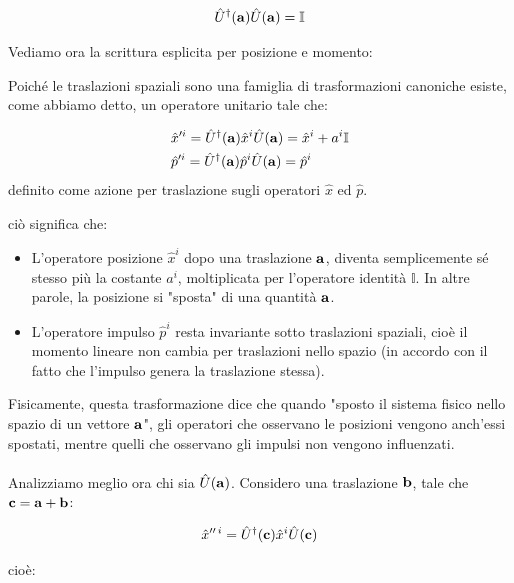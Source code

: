 \begin{align*}
	\hat{U}^{\dagger}(\vb{a}) \hat{U}(\vb{a}) = \mathbb{I}
\end{align*}

	Vediamo ora la scrittura esplicita per posizione e momento:

\begin{nb}
	Poiché le traslazioni spaziali sono una famiglia di trasformazioni canoniche esiste, come abbiamo detto, un operatore unitario tale che:
	
\begin{align*}
	&\hat{x}'^i = \hat{U}^{\dagger}(\vb{a})\hat{x}^i\hat{U}(\vb{a}) = \hat{x}^i + a^i \mathbb{I} \\
	&\hat{p}'^i = \hat{U}^{\dagger}(\vb{a})\hat{p}^i\hat{U}(\vb{a}) = \hat{p}^i 
\end{align*}
	definito come azione per traslazione sugli operatori $\hat{x}$ ed $\hat{p}$.
\end{nb}
	
	ciò significa che:
	
\begin{itemize}
	\item L'operatore posizione $\hat{x}^i$ dopo una traslazione $\vb{a}$, diventa semplicemente sé stesso più la costante $a^i$, moltiplicata per l'operatore identità $\mathbb{I}$. In altre parole, la posizione si "sposta" di una quantità $\vb{a}$.
	 
	\item L'operatore impulso $\hat{p}^i$ resta invariante sotto traslazioni spaziali, cioè il momento lineare non cambia per traslazioni nello spazio (in accordo con il fatto che l'impulso genera la traslazione stessa).
	
\end{itemize}

	Fisicamente, questa trasformazione dice che quando "sposto il sistema fisico nello spazio di un vettore $\vb{a}$", gli operatori che osservano le posizioni vengono anch'essi spostati, mentre quelli che osservano gli impulsi non vengono influenzati.
	\\
	\\
	Analizziamo meglio ora chi sia $\hat{U}(\vb{a})$. Considero una traslazione $\vb{b}$, tale che $\vb{c} = \vb{a} + \vb{b}$:

\begin{align*}
	\hat{x}''^{\,i} = \hat{U}^{\dagger}(\vb{c})\hat{x}^i\hat{U}(\vb{c})
\end{align*}

	cioè:
	
